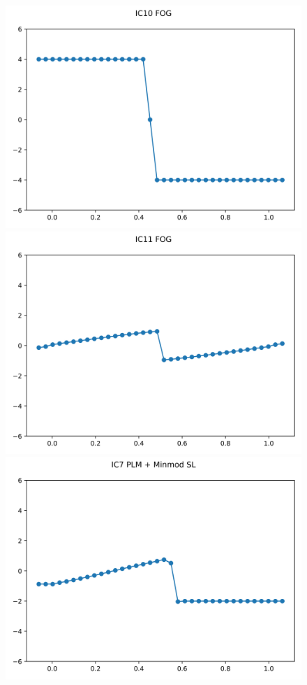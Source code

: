 \documentclass{article}
\begin{document}
\begin{figure}[t]
        \includegraphics[width=.95\textwidth]{../../code/IC10Methodfu_plot.png}
        \includegraphics[width=.95\textwidth]{../../code/IC11Methodfu_plot.png}
    \emp
        \centering
        \includegraphics[width=.95\textwidth]{../../code/IC7Methodpm_plot.png}

\end{figure}
\end{document}
